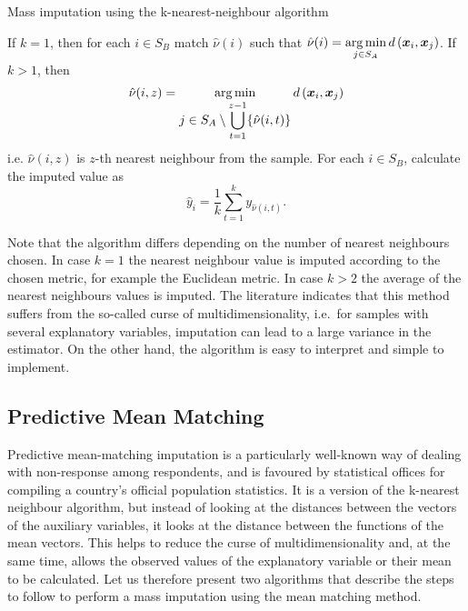 \documentclass[
]{jss}
\begin{document}
\begin{algorithm}[H]
\caption{Mass imputation using the k-nearest-neighbour algorithm}
\label{algo-2}
\begin{algorithmic}[1]
\State If $k=1$, then for each $i \in S_B$ match $\hat{\nu}(i)$ such that
$\displaystyle \hat{\nu}(i)=
\operatornamewithlimits{arg\,min}_{j\in S_{A}}d\left(\boldsymbol{x}_i,\boldsymbol{x}_j\right)$.
\State If $k>1$, then
$$\hat{\nu}(i, z) = \operatornamewithlimits{arg\,min}_{\displaystyle j\in S_{A}\setminus\bigcup_{t=1}^{z-1}
\{\hat{\nu}(i, t)\}} d\left(\boldsymbol{x}_i, \boldsymbol{x}_j\right)$$
i.e. $\hat{\nu}(i, z)$ is $z$-th nearest neighbour from the sample.\;
\State For each $i \in S_B$, calculate the imputed value as
$$
\hat{y}_i = \frac{1}{k}\sum_{t=1}^{k}y_{\hat{\nu}(i, t)}.
$$
\end{algorithmic}
\end{algorithm}

Note that the algorithm differs depending on the number of nearest
neighbours chosen. In case \(k=1\) the nearest neighbour value is
imputed according to the chosen metric, for example the Euclidean
metric. In case \(k>2\) the average of the nearest neighbours values is
imputed. The literature indicates that this method suffers from the
so-called curse of multidimensionality, i.e.~for samples with several
explanatory variables, imputation can lead to a large variance in the
estimator. On the other hand, the algorithm is easy to interpret and
simple to implement.

\subsection{Predictive Mean Matching}\label{predictive-mean-matching}

Predictive mean-matching imputation is a particularly well-known way of
dealing with non-response among respondents, and is favoured by
statistical offices for compiling a country's official population
statistics. It is a version of the k-nearest neighbour algorithm, but
instead of looking at the distances between the vectors of the auxiliary
variables, it looks at the distance between the functions of the mean
vectors. This helps to reduce the curse of multidimensionality and, at
the same time, allows the observed values of the explanatory variable or
their mean to be calculated. Let us therefore present two algorithms
that describe the steps to follow to perform a mass imputation using the
mean matching method.
\end{document}
